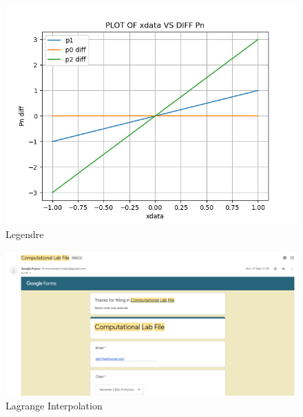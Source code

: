 \documentclass{article}
\begin{document}
\clearpage
\begin{figure}[h]
    \centering
    \includegraphics[width=12cm,height=10cm \textwidth]{Legendre/Figure_2.png}
\caption{Legendre}
\end{figure}

\newpage
\begin{figure}[h]
    \centering
    \includegraphics[width=15cm,height=12cm \textwidth]{3.PNG}
\caption{Lagrange Interpolation}
\end{figure}
\end{document}
